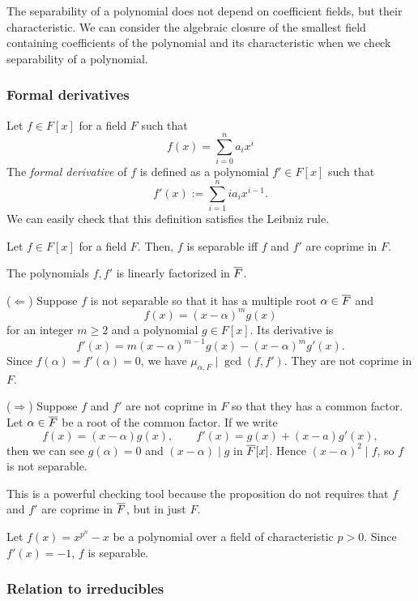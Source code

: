 \documentclass{../exp}
\begin{document}
The separability of a polynomial does not depend on coefficient fields, but their characteristic.
We can consider the algebraic closure of the smallest field containing coefficients of the polynomial and its characteristic when we check separability of a polynomial.


\subsubsection{Formal derivatives}
\begin{defn}
Let $f\in F[x]$ for a field $F$ such that
\[f(x)=\sum_{i=0}^na_ix^i\]
The \emph{formal derivative} of $f$ is defined as a polynomial $f'\in F[x]$ such that
\[f'(x):=\sum_{i=1}^nia_ix^{i-1}.\]
We can easily check that this definition satisfies the Leibniz rule.
\end{defn}

\begin{prop}
Let $f\in F[x]$ for a field $F$.
Then, $f$ is separable iff $f$ and $f'$ are coprime in $F$.
\end{prop}
\begin{pf}
The polynomials $f,f'$ is linearly factorized in $\overline F$.

($\Leftarrow$)
Suppose $f$ is not separable so that it has a multiple root $\alpha\in\overline F$ and
\[f(x)=(x-\alpha)^mg(x)\]
for an integer $m\ge2$ and a polynomial $g\in F[x]$.
Its derivative is
\[f'(x)=m(x-\alpha)^{m-1}g(x)-(x-\alpha)^mg'(x).\]
Since $f(\alpha)=f'(\alpha)=0$, we have $\mu_{\alpha,F}\mid\gcd(f,f')$.
They are not coprime in $F$.

($\Rightarrow$)
Suppose $f$ and $f'$ are not coprime in $F$ so that they has a common factor.
Let $\alpha\in\overline F$ be a root of the common factor.
If we write
\[f(x)=(x-\alpha)g(x),\qquad f'(x)=g(x)+(x-a)g'(x),\]
then we can see $g(\alpha)=0$ and $(x-\alpha)\mid g$ in $\overline F[x]$.
Hence $(x-\alpha)^2\mid f$, so $f$ is not separable.
\end{pf}
\begin{rmk}
This is a powerful checking tool because the proposition do not requires that $f$ and $f'$ are coprime in $\overline F$, but in just $F$.
\end{rmk}

\begin{ex}
Let $f(x)=x^{p^n}-x$ be a polynomial over a field of characteristic $p>0$.
Since $f'(x)=-1$, $f$ is separable.
\end{ex}

\subsubsection{Relation to irreducibles}
\end{document}
